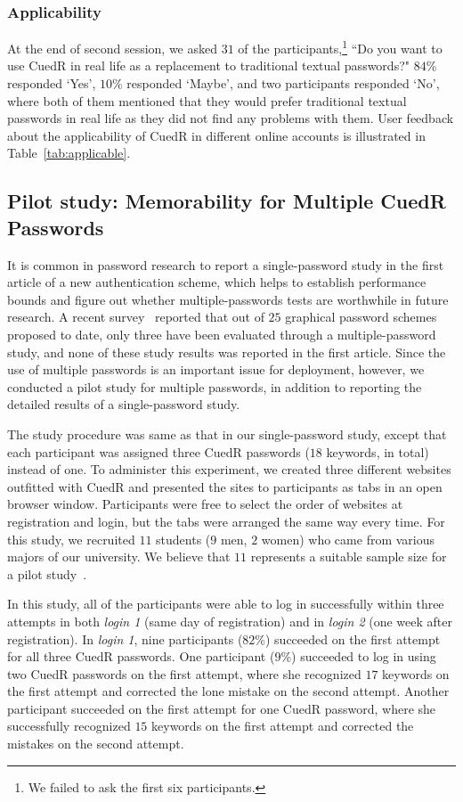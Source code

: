 \subsubsection{Applicability} At the end of second session, we asked $31$ of the participants,\footnote{We failed to ask the first six participants.} ``Do you want to use CuedR in real life as a replacement to traditional textual passwords?" $84$\% responded `Yes', $10$\% responded `Maybe', and two participants responded `No', where both of them mentioned that they would prefer traditional textual passwords in real life as they did not find any problems with them. User feedback about the applicability of CuedR in different online accounts is illustrated in Table~\ref{tab:applicable}.

\subsection{Pilot study: Memorability for Multiple CuedR Passwords}
It is common in password research to report a single-password study in the first article of a new authentication scheme, which helps to establish performance bounds and figure out whether multiple-passwords tests are worthwhile in future research. A recent survey~\cite{survey} reported that out of $25$ graphical password schemes proposed to date, only three have been evaluated through a multiple-password study, and none of these study results was reported in the first article. Since the use of multiple passwords is an important issue for deployment, however, we conducted a pilot study for multiple passwords, in addition to reporting the detailed results of a single-password study.

The study procedure was same as that in our single-password study, except that each participant was assigned three CuedR passwords ($18$ keywords, in total) instead of one. To administer this experiment, we created three different websites outfitted with CuedR and presented the sites to participants as tabs in an open browser window. Participants were free to select the order of websites at registration and login, but the tabs were arranged the same way every time. For this study, we recruited $11$ students ($9$ men, $2$ women) who came from various majors of our university. We believe that $11$ represents a suitable sample size for a pilot study~\cite{pccp_pilot}. 

In this study, all of the participants were able to log in successfully within three attempts in both \textit{login 1} (same day of registration) and in \textit{login 2} (one week after registration). In \textit{login 1}, nine participants ($82$\%) succeeded on the first attempt for all three CuedR passwords. One participant ($9$\%) succeeded to log in using two CuedR passwords on the first attempt, where she recognized $17$ keywords on the first attempt and corrected the lone mistake on the second attempt. Another participant succeeded on the first attempt for one CuedR password, where she successfully recognized $15$ keywords on the first attempt and corrected the mistakes on the second attempt.

